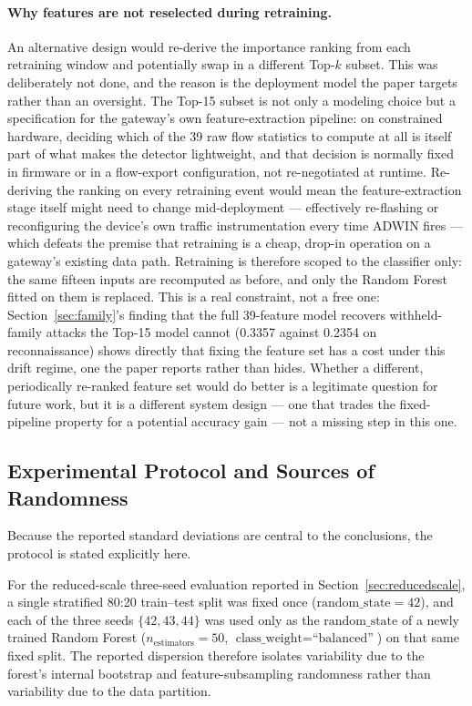 \documentclass[11pt,a4paper]{article}
\begin{document}
\paragraph{Why features are not reselected during retraining.} An
alternative design would re-derive the importance ranking from each
retraining window and potentially swap in a different Top-$k$ subset.
This was deliberately not done, and the reason is the deployment model
the paper targets rather than an oversight. The Top-15 subset is not
only a modeling choice but a specification for the gateway's own
feature-extraction pipeline: on constrained hardware, deciding which of
the 39 raw flow statistics to compute at all is itself part of what
makes the detector lightweight, and that decision is normally fixed in
firmware or in a flow-export configuration, not re-negotiated at
runtime. Re-deriving the ranking on every retraining event would mean
the feature-extraction stage itself might need to change mid-deployment
--- effectively re-flashing or reconfiguring the device's own traffic
instrumentation every time ADWIN fires --- which defeats the premise
that retraining is a cheap, drop-in operation on a gateway's existing
data path. Retraining is therefore scoped to the classifier only: the
same fifteen inputs are recomputed as before, and only the Random
Forest fitted on them is replaced. This is a real constraint, not a
free one: Section~\ref{sec:family}'s finding that the full 39-feature
model recovers withheld-family attacks the Top-15 model cannot
(0.3357 against 0.2354 on reconnaissance) shows directly that fixing
the feature set has a cost under this drift regime, one the paper
reports rather than hides. Whether a different, periodically
re-ranked feature set would do better is a legitimate question for
future work, but it is a different system design --- one that trades
the fixed-pipeline property for a potential accuracy gain --- not a
missing step in this one.

\subsection{Experimental Protocol and Sources of Randomness}
\label{sec:protocol}

Because the reported standard deviations are central to the conclusions,
the protocol is stated explicitly here.

For the reduced-scale three-seed evaluation reported in
Section~\ref{sec:reducedscale}, a single stratified 80:20
train--test split was fixed once ($\text{random\_state} = 42$), and each
of the three seeds $\{42, 43, 44\}$ was used only as the
$\text{random\_state}$ of a newly trained Random Forest
($n_{\text{estimators}} = 50$, $\text{class\_weight} =
\text{``balanced''}$) on that same fixed split. The reported dispersion
therefore isolates variability due to the forest's internal bootstrap
and feature-subsampling randomness rather than variability due to the
data partition.
\end{document}
